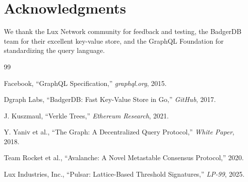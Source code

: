 \section*{Acknowledgments}


We thank the Lux Network community for feedback and testing, the BadgerDB team for their excellent key-value store, and the GraphQL Foundation for standardizing the query language.


\begin{thebibliography}{99}

Facebook, ``GraphQL Specification,'' \textit{graphql.org}, 2015.

Dgraph Labs, ``BadgerDB: Fast Key-Value Store in Go,'' \textit{GitHub}, 2017.

J. Kuszmaul, ``Verkle Trees,'' \textit{Ethereum Research}, 2021.

Y. Yaniv et al., ``The Graph: A Decentralized Query Protocol,'' \textit{White Paper}, 2018.

Team Rocket et al., ``Avalanche: A Novel Metastable Consensus Protocol,'' 2020.

Lux Industries, Inc., ``Pulsar: Lattice-Based Threshold Signatures,'' \textit{LP-99}, 2025.

\end{thebibliography}

\appendix

